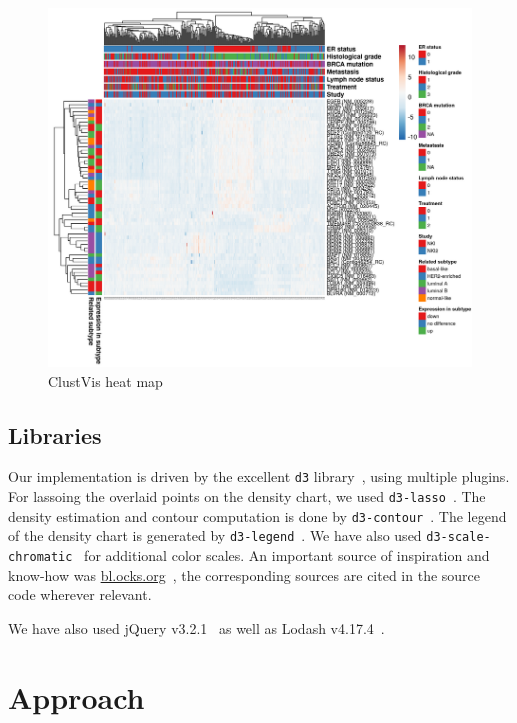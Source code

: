 \documentclass{vgtc} %
\begin{document}
\begin{figure}[bt]
    \centering
    \includegraphics[width=\columnwidth]{clustvis-heat}
    \caption{ClustVis heat map}
    \label{fig:clustvis-heatmap}
\end{figure}

\subsection{Libraries}

Our implementation is driven by the excellent \texttt{d3} library~\cite{d3},
using multiple plugins. For lassoing the overlaid points on the density chart,
we used \texttt{d3-lasso}~\cite{d3-lasso}. The density estimation and contour
computation is done by \texttt{d3-contour}~\cite{d3-contour}. The legend of the
density chart is generated by \texttt{d3-legend}~\cite{d3-legend}. We have also
used \texttt{d3-scale-chromatic}~\cite{d3-scale-chromatic} for additional color
scales. An important source of inspiration and know-how was
\url{bl.ocks.org}~\cite{blocks}, the corresponding sources are cited in the
source code wherever relevant.

We have also used jQuery v3.2.1~\cite{jquery} as well as Lodash
v4.17.4~\cite{lodash}.

\section{Approach} %
\end{document}
